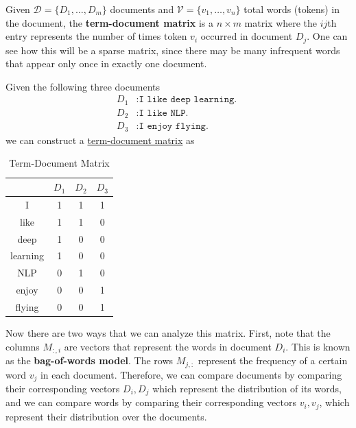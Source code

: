 \documentclass{article}
\begin{document}
      \begin{definition}
        \label{def:term-document-matrix}
        Given $\mathcal{D} = \{D_1, \ldots, D_m\}$ documents and $\mathcal{V} = \{v_1, \ldots, v_n\}$ total words (tokens) in the document, the \textbf{term-document matrix} is a $n \times m$ matrix where the $ij$th entry represents the number of times token $v_i$ occurred in document $D_j$. One can see how this will be a sparse matrix, since there may be many infrequent words that appear only once in exactly one document. 
      \end{definition}

      \begin{example}
        \label{ex:term-document-matrix-for-three-documents}
        Given the following three documents 
        \begin{align*}
            D_1 & : \texttt{I like deep learning. } \\
            D_2 & : \texttt{I like NLP. } \\
            D_3 & : \texttt{I enjoy flying.}
        \end{align*}
        we can construct a \hyperref[def:term-document-matrix]{term-document matrix} as 
        \begin{table}[H]
          \centering
          \begin{tabular}{|c||*{3}{c|}}
          \hline
           & $D_1$ & $D_2$ & $D_3$ \\ 
          \hline\hline
          I       & 1 & 1 & 1 \\ \hline
          like    & 1 & 1 & 0\\ \hline
          deep    & 1 & 0 & 0 \\ \hline
          learning& 1 & 0 & 0 \\ \hline
          NLP     & 0 & 1 & 0 \\ \hline
          enjoy   & 0 & 0 & 1 \\ \hline
          flying  & 0 & 0 & 1 \\ \hline
          \end{tabular}
          \caption{Term-Document Matrix}
        \end{table}
      \end{example}

      Now there are two ways that we can analyze this matrix. First, note that the columns $M_{:, i}$ are vectors that represent the words in document $D_i$. This is known as the \textbf{bag-of-words model}. The rows $M_{j, :}$ represent the frequency of a certain word $v_j$ in each document. Therefore, we can compare documents by comparing their corresponding vectors $D_i, D_j$ which represent the distribution of its words, and we can compare words by comparing their corresponding vectors $v_i, v_j$, which represent their distribution over the documents. 
\end{document}
